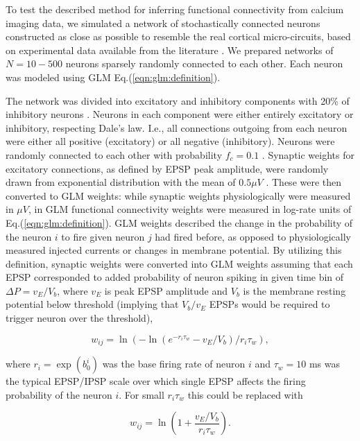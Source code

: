 To test the described method for inferring functional connectivity from calcium imaging data, we simulated a network of stochastically connected neurons constructed as close as possible to resemble the real cortical micro-circuits, based on experimental data available from the literature \cite{Braitenberg1998, Urquijo2000, Lefort2009, Sayer1990}.  We prepared networks of $N=10-500$ neurons sparsely randomly connected to each other. Each neuron was modeled using GLM Eq.(\ref{eqn:glm:definition}).

The network was divided into excitatory and inhibitory components with 20\% of inhibitory neurons \cite{Braitenberg1998, Urquijo2000}.  Neurons in each component were either entirely excitatory or inhibitory, respecting Dale's law. I.e., all connections outgoing from each neuron were either all positive (excitatory) or all negative (inhibitory). Neurons were randomly connected to each other with probability $f_c=0.1$ \cite{Braitenberg1998, Lefort2009}.  Synaptic weights for excitatory connections, as defined by EPSP peak amplitude, were randomly drawn from exponential distribution with the mean of $0.5 \mu V$ \cite{Lefort2009, Sayer1990}. These were then converted to GLM weights: while synaptic weights physiologically were measured in $\mu V$, in GLM functional connectivity weights were measured in log-rate units of Eq.(\ref{eqn:glm:definition}). GLM weights described the change in the probability of the neuron $i$ to fire given neuron $j$ had fired before, as opposed to physiologically measured injected currents or changes in membrane potential. By utilizing this definition, synaptic weights were converted into GLM weights assuming that each EPSP corresponded to added probability of neuron spiking in given time bin of $\Delta P = v_{E}/V_{b}$, where $v_E$ is peak EPSP amplitude and $V_b$ is the membrane resting potential below threshold (implying that $V_{b}/v_{E}$ EPSPs would be required to trigger neuron over the threshold), 

\begin{equation}\label{eqn:convert}
w_{ij}=\ln(-\ln(e^{-r_i\tau_w}-v_{E}/V_{b})/r_i\tau_w), 
\end{equation}

where $r_i=\exp(b^i_0)$ was the base firing rate of neuron $i$ and $\tau_w=10$ ms was the typical EPSP/IPSP scale over which single EPSP affects the firing probability of the neuron $i$.  For small $r_i\tau_w$ this could be replaced with

\begin{equation}\label{eqn:convert-smalldt}
w_{ij}=\ln\left(1+\frac{v_{E}/V_{b}}{r_i\tau_w}\right).
\end{equation}

